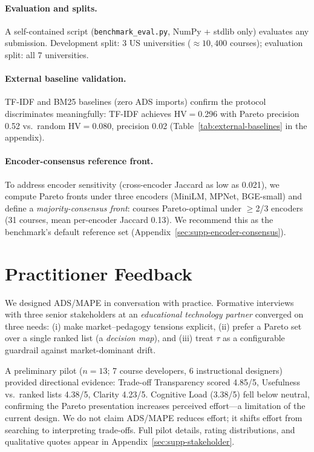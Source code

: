 \documentclass[sigconf,review]{acmart}
\newcommand{\NumUniversities}{7}
\newcommand{\ADS}{\textsc{ADS}\xspace}
\newcommand{\MAPE}{\textsc{MAPE}\xspace}
\newcommand{\IndustryPartner}{\textit{educational technology partner}}
\begin{document}
\paragraph{Evaluation and splits.}
A self-contained script (\texttt{benchmark\_eval.py}, NumPy + stdlib only) evaluates any submission. Development split: 3 US universities (${\approx}10{,}400$ courses); evaluation split: all {\NumUniversities} universities.

\paragraph{External baseline validation.}
TF-IDF and BM25 baselines (zero ADS imports) confirm the protocol discriminates meaningfully: TF-IDF achieves HV$=$0.296 with Pareto precision 0.52 vs.\ random HV$=$0.080, precision 0.02 (Table~\ref{tab:external-baselines} in the appendix).

\paragraph{Encoder-consensus reference front.}
To address encoder sensitivity (cross-encoder Jaccard as low as 0.021), we compute Pareto fronts under three encoders (MiniLM, MPNet, BGE-small) and define a \emph{majority-consensus front}: courses Pareto-optimal under $\geq$2/3 encoders (31 courses, mean per-encoder Jaccard 0.13). We recommend this as the benchmark's default reference set (Appendix~\ref{sec:supp-encoder-consensus}).


\section{Practitioner Feedback}
\label{sec:collab}

We designed \ADS/\MAPE in conversation with practice. Formative interviews with three senior stakeholders at an \IndustryPartner{} converged on three needs: (i) make market--pedagogy tensions explicit, (ii) prefer a Pareto set over a single ranked list (a \emph{decision map}), and (iii) treat $\tau$ as a configurable guardrail against market-dominant drift.

A preliminary pilot ($n{=}13$; 7 course developers, 6 instructional designers) provided directional evidence: Trade-off Transparency scored 4.85/5, Usefulness vs.\ ranked lists 4.38/5, Clarity 4.23/5. Cognitive Load (3.38/5) fell below neutral, confirming the Pareto presentation increases perceived effort---a limitation of the current design. We do not claim \ADS/\MAPE reduces effort; it shifts effort from searching to interpreting trade-offs. Full pilot details, rating distributions, and qualitative quotes appear in Appendix~\ref{sec:supp-stakeholder}.
\end{document}
